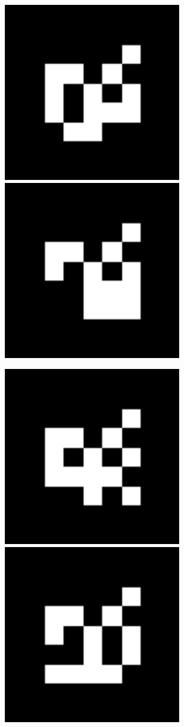 \documentclass[10pt,letterpaper]{article}
\begin{document}
\includegraphics[width=3in]{MarkerData_133.png}
\includegraphics[width=3in]{MarkerData_134.png}


\includegraphics[width=3in]{MarkerData_135.png}
\includegraphics[width=3in]{MarkerData_136.png}
\end{document}
